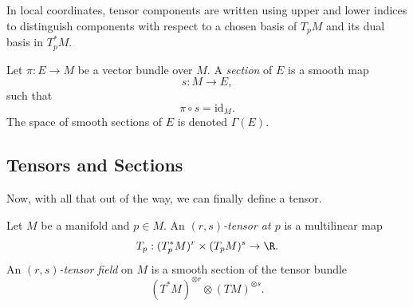In local coordinates, tensor components are written using upper and lower indices to distinguish components with respect to a chosen basis of $T_pM$ and its dual basis in $T_p^*M$.

\begin{definition}
  Let $\pi : E \to M$ be a vector bundle over $M$. A \emph{section} of $E$ is a smooth map
  \[%
    s : M \to E
  ,\]%
  such that
  \[%
    \pi \circ s = \mathrm{id}_M
  .\]%
  The space of smooth sections of $E$ is denoted $\Gamma(E)$.
\end{definition}


\subsection{Tensors and Sections}

Now, with all that out of the way, we can finally define a tensor.

\begin{definition}
  Let $M$ be a manifold and $p \in M$. An \emph{$(r,s)$-tensor at $p$} is a multilinear map
  \[%
    T_p : (T_p^*M)^r \times (T_pM)^s \to \R
  .\]%
  An \emph{$(r,s)$-tensor field} on $M$ is a smooth section of the tensor bundle
  \[%
    (T^*M)^{\otimes r} \otimes (TM)^{\otimes s}
  .\]%
\end{definition}

